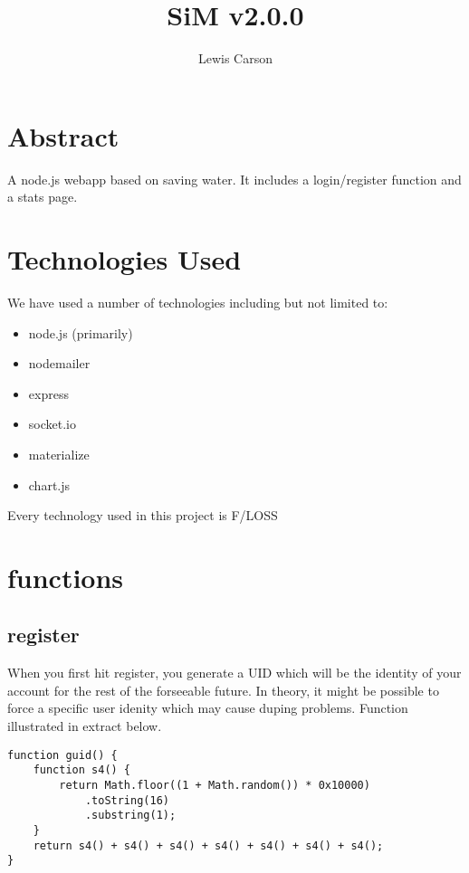 \documentclass{article}
\begin{document}
\title{SiM v2.0.0}
\author{Lewis Carson}

\maketitle

\section{Abstract}
A node.js webapp based on saving water. It includes a login/register function and a stats page.

\section{Technologies Used}
We have used a number of technologies including but not limited to:

\begin{itemize}
    \item node.js (primarily)
    \item nodemailer
    \item express
    \item socket.io
    \item materialize
    \item chart.js
\end{itemize}

Every technology used in this project is F/LOSS

\section{functions}
\subsection{register}
When you first hit register, you generate a UID which will be the identity of your account for the rest of the forseeable future. In theory, it might be possible to force a specific user idenity which may cause duping problems. Function illustrated in extract below.

\begin{minipage}{\linewidth}
\begin{lstlisting}
function guid() {
    function s4() {
        return Math.floor((1 + Math.random()) * 0x10000)
            .toString(16)
            .substring(1);
    }
    return s4() + s4() + s4() + s4() + s4() + s4() + s4();
}

\end{lstlisting}
\end{minipage}
\end{document}
